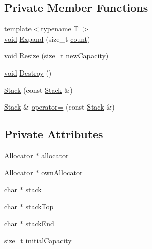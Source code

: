 \subsection*{Private Member Functions}
\begin{DoxyCompactItemize}
\item 
{\footnotesize template$<$typename T $>$ }\\\hyperlink{imgui__impl__opengl3__loader_8h_ac668e7cffd9e2e9cfee428b9b2f34fa7}{void} \hyperlink{classinternal_1_1Stack_a5a530d1d2a39a05812e4fee0e299004a}{Expand} (size\+\_\+t \hyperlink{imgui__impl__opengl3__loader_8h_a619bc20e8198de3bd3f3d7fc34de66b2}{count})
\item 
\hyperlink{imgui__impl__opengl3__loader_8h_ac668e7cffd9e2e9cfee428b9b2f34fa7}{void} \hyperlink{classinternal_1_1Stack_a0a23948aa17a9870a5e228d465e40e92}{Resize} (size\+\_\+t new\+Capacity)
\item 
\hyperlink{imgui__impl__opengl3__loader_8h_ac668e7cffd9e2e9cfee428b9b2f34fa7}{void} \hyperlink{classinternal_1_1Stack_a5efa6fdbfaf93c5e519a2e6f39bd081f}{Destroy} ()
\item 
\hyperlink{classinternal_1_1Stack_af4109a9e632f85f70ac01c69d3ccdb3b}{Stack} (const \hyperlink{classinternal_1_1Stack}{Stack} \&)
\item 
\hyperlink{classinternal_1_1Stack}{Stack} \& \hyperlink{classinternal_1_1Stack_ae21d491cc0c4a22a2c131d88c0a37ae1}{operator=} (const \hyperlink{classinternal_1_1Stack}{Stack} \&)
\end{DoxyCompactItemize}
\subsection*{Private Attributes}
\begin{DoxyCompactItemize}
\item 
Allocator $\ast$ \hyperlink{classinternal_1_1Stack_a029e18096d082b1c81d7e1075a15eaad}{allocator\+\_\+}
\item 
Allocator $\ast$ \hyperlink{classinternal_1_1Stack_a71e95d02ac850a97e1ee3628a207cbe9}{own\+Allocator\+\_\+}
\item 
char $\ast$ \hyperlink{classinternal_1_1Stack_ae2601d824b6b2f17eadd6739eec5c942}{stack\+\_\+}
\item 
char $\ast$ \hyperlink{classinternal_1_1Stack_aad0ee46c4a6180e2f3e0d9f4348c31f2}{stack\+Top\+\_\+}
\item 
char $\ast$ \hyperlink{classinternal_1_1Stack_af21b647d9f73246e9c96fa0966bdaf5d}{stack\+End\+\_\+}
\item 
size\+\_\+t \hyperlink{classinternal_1_1Stack_a224b9fa2406bc1c411068fa36c67c90f}{initial\+Capacity\+\_\+}
\end{DoxyCompactItemize}


